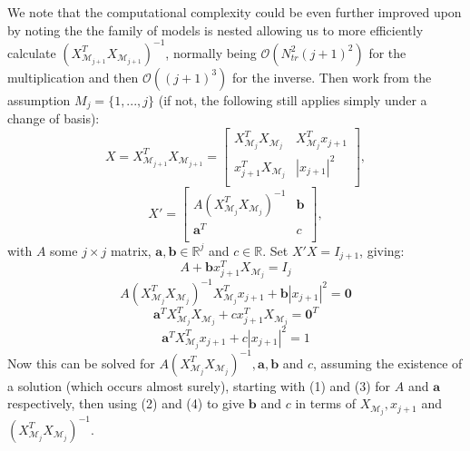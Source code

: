 \documentclass{article}
\begin{document}
We note that the computational complexity could be even further improved upon by noting the the family of models is nested allowing us to more efficiently calculate $(X_{\mathcal{M}_{j+1}}^T X_{\mathcal{M}_{j+1}})^{-1}$, normally being $\mathcal{O}(N_{tr}^2 (j+1)^2)$ for the multiplication and then $\mathcal{O}((j+1)^3)$ for the inverse. Then work from the assumption $M_j=\{ 1,...,j \}$ (if not, the following still applies simply under a change of basis):
\begin{equation*}
X=X_{\mathcal{M}_{j+1}}^T X_{\mathcal{M}_{j+1}} = 
\begin{bmatrix}
X_{\mathcal{M}_{j}}^T X_{\mathcal{M}_{j}} & X_{\mathcal{M}_{j}}^T x_{j+1} \\
x_{j+1}^T X_{\mathcal{M}_{j}} & |x_{j+1}|^2 \\
\end{bmatrix}
,
\end{equation*}
\begin{equation*}
X'= 
\begin{bmatrix}
A(X_{\mathcal{M}_{j}}^T X_{\mathcal{M}_{j}})^{-1} & \mathbf{b} \\ 
\mathbf{a}^T & c \\
\end{bmatrix}
,
\end{equation*}
with $A$ some $j \times j$ matrix, $\mathbf{a}, \mathbf{b} \in \mathbb{R}^j$ and $c \in \mathbb{R}$. Set $X' X = I_{j+1}$, giving:
\begin{equation}
A+\mathbf{b} x_{j+1}^T X_{\mathcal{M}_j}=I_j
\end{equation}
\begin{equation}
A(X_{\mathcal{M}_{j}}^T X_{\mathcal{M}_{j}})^{-1} X_{\mathcal{M}_{j}}^T x_{j+1} + \mathbf{b} |x_{j+1}|^2 = \mathbf{0}
\end{equation}
\begin{equation}
\mathbf{a}^T X_{\mathcal{M}_{j}}^T X_{\mathcal{M}_{j}} + c x_{j+1}^T X_{\mathcal{M}_{j}} = \mathbf{0}^T
\end{equation}
\begin{equation}
\mathbf{a}^T X_{\mathcal{M}_{j}}^T x_{j+1} + c |x_{j+1}|^2 = 1
\end{equation}
Now this can be solved for $A(X_{\mathcal{M}_{j}}^T X_{\mathcal{M}_{j}})^{-1},\mathbf{a}, \mathbf{b}$ and $c$, assuming the existence of a solution (which occurs almost surely), starting with (1) and (3) for $A$ and $\mathbf{a}$ respectively, then using (2) and (4) to give $\mathbf{b}$ and $c$ in terms of $X_{\mathcal{M}_{j}}, x_{j+1}$ and $(X_{\mathcal{M}_{j}}^T X_{\mathcal{M}_{j}})^{-1}$.
\end{document}
